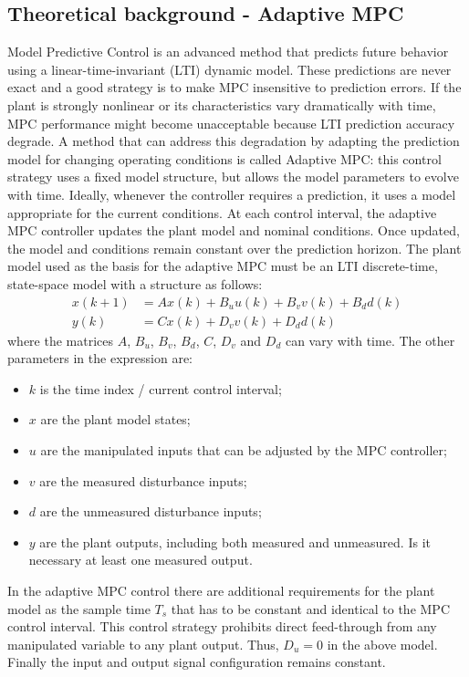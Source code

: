 \documentclass[conference, 11pt]{IEEEtran}
\begin{document}
\subsection{Theoretical background - Adaptive MPC}
Model Predictive Control is an advanced method that predicts future behavior using a linear-time-invariant (LTI) dynamic model. These predictions are never exact and a good strategy is to make MPC insensitive to prediction errors. If the plant is strongly nonlinear or its characteristics vary dramatically with time, MPC performance might become unacceptable because LTI prediction accuracy degrade. A method that can address this degradation by adapting the prediction model for changing operating conditions is called Adaptive MPC: this control strategy uses a fixed model structure, but allows the model parameters to evolve with time. Ideally, whenever the controller requires a prediction, it uses a model appropriate for the current conditions. At each control interval, the adaptive MPC controller updates the plant model and nominal conditions. Once updated, the model and conditions remain constant over the prediction horizon. The plant model used as the basis for the adaptive MPC must be an LTI discrete-time, state-space model with a structure as follows:
\begin{equation*}
\label{eqn:Adaptive_MPC_plant_discrete}
\begin{aligned}
x(k+1)&=Ax(k)+ B_u u(k)+B_v v(k)+B_d d(k)\\
y(k)&=Cx(k) + D_v v(k)+ D_d d(k)
\end{aligned}
\end{equation*}
where the matrices $A$, $B_u$, $B_v$, $B_d$, $C$, $D_v$ and $D_d$ can vary with time. The other parameters in the expression are:
\begin{itemize}
	\item $k$ is the time index / current control interval;
	\item $x$ are the plant model states;
	\item $u$ are the manipulated inputs that can be adjusted by the MPC controller;
	\item $v$ are the measured disturbance inputs;
	\item $d$ are the unmeasured disturbance inputs;
	\item $y$ are the plant outputs, including both measured and unmeasured. Is it necessary at least one measured output.
\end{itemize}
In the adaptive MPC control there are additional requirements for the plant model as the sample time $T_s$ that has to be constant and identical to the MPC control interval. This control strategy prohibits direct feed-through from any manipulated variable to any plant output. Thus, $D_u = 0$ in the above model. Finally the input and output signal configuration remains constant.
\end{document}
